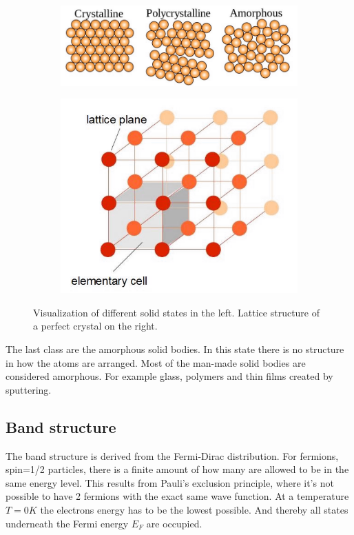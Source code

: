 \documentclass[]{article}
\begin{document}
\begin{figure}[H]
\centering
\begin{subfigure}[h]{0.59\textwidth}
\includegraphics[width=1\textwidth]{Plots/crystalline.png}
\end{subfigure}
\begin{subfigure}[h]{0.39\textwidth}
\includegraphics[width=1\textwidth]{Plots/lattice.png}
\end{subfigure}
\caption{Visualization of different solid states in the left. Lattice structure of a perfect crystal on the right. \cite{wiki}}
\end{figure}


The last class are the amorphous solid bodies. In this state there is no structure in how the atoms are arranged. Most of the man-made solid bodies are considered amorphous. For example glass, polymers and thin films created by sputtering. 

\subsection{Band structure}
The band structure is derived from the Fermi-Dirac distribution. For fermions, spin=1/2 particles, there is a finite amount of how many are allowed to be in the same energy level. This results from Pauli's exclusion principle, where it's not possible to have 2 fermions with the exact same wave function. At a temperature $T=0K$ the electrons energy has to be the lowest possible. And thereby all states underneath the Fermi energy $E_F$ are occupied.
\end{document}
